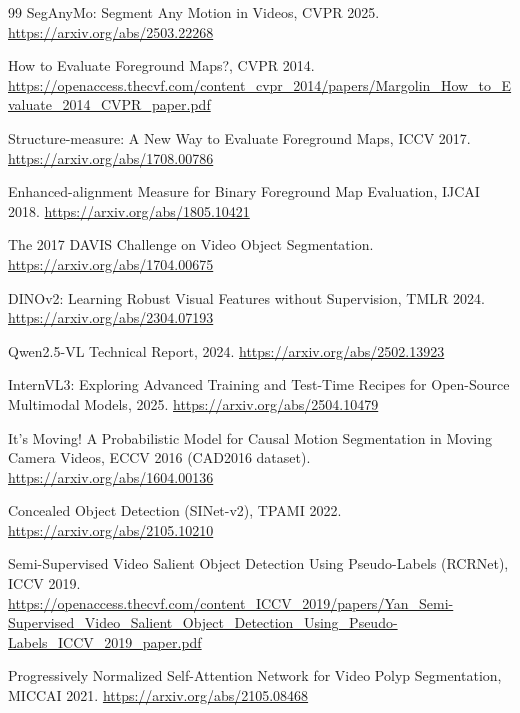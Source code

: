 \documentclass[11pt]{article}
\begin{document}
\begin{thebibliography}{99}
SegAnyMo: Segment Any Motion in Videos, CVPR 2025.\newline
\url{https://arxiv.org/abs/2503.22268}

How to Evaluate Foreground Maps?, CVPR 2014.\newline
\url{https://openaccess.thecvf.com/content_cvpr_2014/papers/Margolin_How_to_Evaluate_2014_CVPR_paper.pdf}

Structure-measure: A New Way to Evaluate Foreground Maps, ICCV 2017.\newline
\url{https://arxiv.org/abs/1708.00786}

Enhanced-alignment Measure for Binary Foreground Map Evaluation, IJCAI 2018.\newline
\url{https://arxiv.org/abs/1805.10421}

The 2017 DAVIS Challenge on Video Object Segmentation.\newline
\url{https://arxiv.org/abs/1704.00675}

DINOv2: Learning Robust Visual Features without Supervision, TMLR 2024.\newline
\url{https://arxiv.org/abs/2304.07193}

Qwen2.5-VL Technical Report, 2024.\newline
\url{https://arxiv.org/abs/2502.13923}

InternVL3: Exploring Advanced Training and Test-Time Recipes for Open-Source Multimodal Models, 2025.\newline
\url{https://arxiv.org/abs/2504.10479}

It's Moving! A Probabilistic Model for Causal Motion Segmentation in Moving Camera Videos, ECCV 2016 (CAD2016 dataset).\newline
\url{https://arxiv.org/abs/1604.00136}

Concealed Object Detection (SINet-v2), TPAMI 2022.\newline
\url{https://arxiv.org/abs/2105.10210}

Semi-Supervised Video Salient Object Detection Using Pseudo-Labels (RCRNet), ICCV 2019.\newline
\url{https://openaccess.thecvf.com/content_ICCV_2019/papers/Yan_Semi-Supervised_Video_Salient_Object_Detection_Using_Pseudo-Labels_ICCV_2019_paper.pdf}

Progressively Normalized Self-Attention Network for Video Polyp Segmentation, MICCAI 2021.\newline
\url{https://arxiv.org/abs/2105.08468}


\end{thebibliography}
\end{document}
